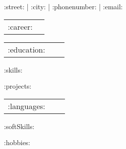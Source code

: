 \documentclass[12pt]{article}
\begin{document}

    \begin{center}
    {
        \small\bodyfont
        \faEnvelopeO\/ :street: | \faMapMarker\/ :city: | \faPhone\/ :phonenumber: |\faAt\protect\/ :email:
    }
    \end{center}


    \setlength{\parskip}{\baselineskip}
    \setlength{\parindent}{2pt}


    \begin{longtable}{p{11em}| p{25em}}
        :career:
    \end{longtable}


    \begin{longtable}{p{11em}| p{25em} c}
        :education:
    \end{longtable}

    :skills:


    :projects:


    \begin{longtable}{p{11em}| p{25em} c}
        :languages:
    \end{longtable}


    :softSkills:


    :hobbies:
\end{document}
